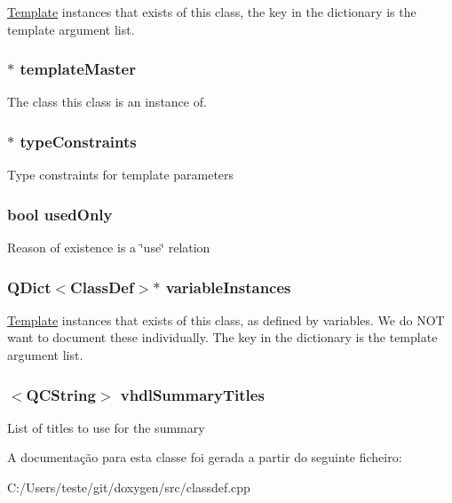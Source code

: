 \hyperlink{class_template}{Template} instances that exists of this class, the key in the dictionary is the template argument list. \hypertarget{class_class_def_impl_ab15069d1a1d6d67311966eb2fbbefd37}{
\subsubsection[{template\-Master}]{$\ast$ template\-Master}}\label{class_class_def_impl_ab15069d1a1d6d67311966eb2fbbefd37}
The class this class is an instance of. \hypertarget{class_class_def_impl_adefae2de7d374d135863ba982399500d}{
\subsubsection[{type\-Constraints}]{$\ast$ type\-Constraints}}\label{class_class_def_impl_adefae2de7d374d135863ba982399500d}
Type constraints for template parameters \hypertarget{class_class_def_impl_a6220c6b3d9e0fc97dbb0c56d446d37d5}{
\subsubsection[{used\-Only}]{\setlength{\rightskip}{0pt plus 5cm}bool used\-Only}}\label{class_class_def_impl_a6220c6b3d9e0fc97dbb0c56d446d37d5}
Reason of existence is a \char`\"{}use\char`\"{} relation \hypertarget{class_class_def_impl_a06b615e222cf24da9484fa3ebdc91e3d}{
\subsubsection[{variable\-Instances}]{\setlength{\rightskip}{0pt plus 5cm}Q\-Dict$<${\bf Class\-Def}$>$$\ast$ variable\-Instances}}\label{class_class_def_impl_a06b615e222cf24da9484fa3ebdc91e3d}
\hyperlink{class_template}{Template} instances that exists of this class, as defined by variables. We do N\-O\-T want to document these individually. The key in the dictionary is the template argument list. \hypertarget{class_class_def_impl_a70b6b23084b915bdfc841b0139d4e331}{
\subsubsection[{vhdl\-Summary\-Titles}]{$<${\bf Q\-C\-String}$>$ vhdl\-Summary\-Titles}}\label{class_class_def_impl_a70b6b23084b915bdfc841b0139d4e331}
List of titles to use for the summary 

A documentação para esta classe foi gerada a partir do seguinte ficheiro\-:\begin{DoxyCompactItemize}
\item 
C\-:/\-Users/teste/git/doxygen/src/classdef.\-cpp\end{DoxyCompactItemize}
